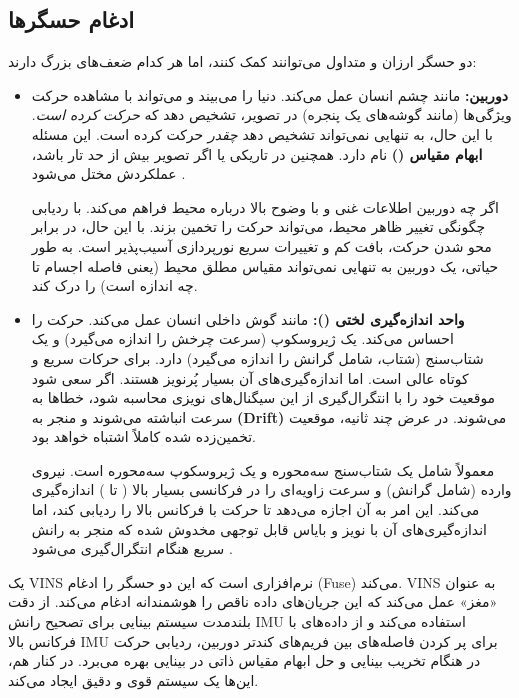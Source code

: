 \documentclass[11pt, a4paper]{article}
\begin{document}
	\subsection{ادغام حسگرها}
	دو حسگر ارزان و متداول می‌توانند کمک کنند، اما هر کدام ضعف‌های بزرگ دارند:
	\begin{itemize}
		\item \textbf{دوربین:} مانند چشم‌ انسان عمل می‌کند. دنیا را می‌بیند و می‌تواند با مشاهده حرکت ویژگی‌ها (مانند گوشه‌های یک پنجره) در تصویر، تشخیص دهد که \emph{حرکت کرده است}. با این حال، به تنهایی نمی‌تواند تشخیص دهد \emph{چقدر} حرکت کرده است.
		این مسئله \textbf{ابهام مقیاس ()} نام دارد. همچنین در تاریکی یا اگر تصویر بیش از حد تار باشد، عملکردش مختل می‌شود
		\cite{huang2019visual}.
		
		اگر چه دوربین اطلاعات غنی و با وضوح بالا درباره محیط فراهم می‌کند. با ردیابی چگونگی تغییر ظاهر محیط، می‌تواند حرکت را تخمین بزند. با این حال، در برابر محو شدن حرکت، بافت کم و تغییرات سریع نورپردازی آسیب‌پذیر است. به طور حیاتی، یک دوربین به تنهایی نمی‌تواند مقیاس مطلق محیط (یعنی فاصله اجسام تا چه اندازه است) را درک کند.
		\item \textbf{واحد اندازه‌گیری لختی ():}
		مانند گوش داخلی انسان عمل می‌کند. حرکت را احساس می‌کند. یک ژیروسکوپ (سرعت چرخش را اندازه می‌گیرد) و یک شتاب‌سنج (شتاب، شامل گرانش را اندازه می‌گیرد) دارد. برای حرکات سریع و کوتاه عالی است. اما اندازه‌گیری‌های آن بسیار پُرنویز هستند. اگر سعی شود موقعیت خود را با انتگرال‌گیری از این سیگنال‌های نویزی محاسبه شود، خطاها به سرعت انباشته می‌شوند و منجر به \textbf{(Drift)} می‌شوند. در عرض چند ثانیه، موقعیت تخمین‌زده شده کاملاً اشتباه خواهد بود.
		
		معمولاً  شامل یک شتاب‌سنج سه‌محوره و یک ژیروسکوپ سه‌محوره است. نیروی وارده (شامل گرانش) و سرعت زاویه‌ای را در فرکانسی بسیار بالا
		( تا ) اندازه‌گیری می‌کند. این امر به آن اجازه می‌دهد تا حرکت با فرکانس بالا را ردیابی کند، اما اندازه‌گیری‌های آن با نویز و بایاس قابل توجهی مخدوش شده که منجر به رانش سریع هنگام انتگرال‌گیری می‌شود
		\cite{mourikis2007multi}.
	\end{itemize}
	
	یک \gls{VINS} نرم‌افزاری است که این دو حسگر را ادغام (Fuse) می‌کند. 	\gls{VINS} به عنوان «مغز» عمل می‌کند که این جریان‌های داده ناقص را هوشمندانه ادغام می‌کند. از دقت بلندمدت سیستم بینایی برای تصحیح رانش IMU استفاده می‌کند و از داده‌های با فرکانس بالا IMU برای پر کردن فاصله‌های بین فریم‌های کندتر دوربین، ردیابی حرکت در هنگام تخریب بینایی و حل ابهام مقیاس ذاتی در بینایی بهره می‌برد.  در کنار هم، این‌ها یک سیستم قوی و دقیق ایجاد می‌کند.
	
\end{document}
